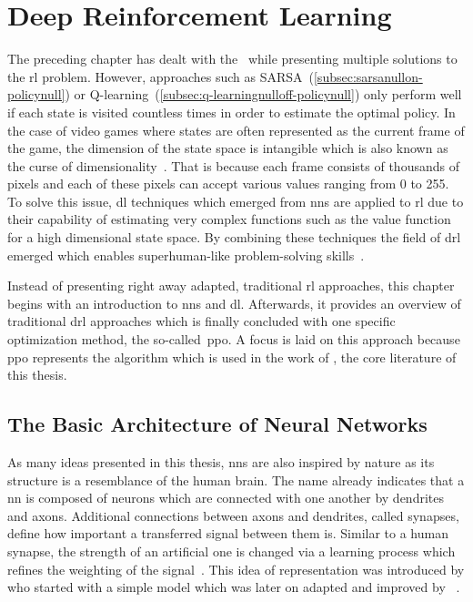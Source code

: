 \documentclass[draft,final]{vutinfth} %
\newcommand{\pautoref}[1]{(\autoref{#1})}
\newcommand{\p}[1]{see p. #1}
\begin{document}
    \glsresetall


    \chapter{Deep Reinforcement Learning}\label{ch:deep-reinforcement-learning}


    The preceding chapter has dealt with the~ while presenting multiple solutions to the \gls{rl} problem.
    However, approaches such as SARSA~\pautoref{subsec:sarsanullon-policynull} or Q-learning~\pautoref{subsec:q-learningnulloff-policynull} only perform well if each state is visited countless times in order to estimate the optimal policy.
    In the case of video games where states are often represented as the current frame of the game, the dimension of the state space is intangible which is also known as the curse of dimensionality~\citep[\p{151}]{goodfellow_deep_2016}.
    That is because each frame consists of thousands of pixels and each of these pixels can accept various values ranging from 0 to 255.
    To solve this issue, \gls{dl} techniques which emerged from \glspl{nn} are applied to \gls{rl} due to their capability of estimating very complex functions such as the value function for a high dimensional state space.
    By combining these techniques the field of \gls{drl} emerged which enables superhuman-like problem-solving skills~\citep{francois-lavet_introduction_2018}.

    Instead of presenting right away adapted, traditional \gls{rl} approaches, this chapter begins with an introduction to \glspl{nn} and \gls{dl}.
    Afterwards, it provides an overview of traditional \gls{drl} approaches which is finally concluded with one specific optimization method, the so-called~\gls{ppo}.
    A focus is laid on this approach because \gls{ppo} represents the algorithm which is used in the work of \citet{burda_large-scale_2018-1}, the core literature of this thesis.


    \section{The Basic Architecture of Neural Networks}\label{sec:the-basic-architecture-of-neural-networks}


    As many ideas presented in this thesis, \glspl{nn} are also inspired by nature as its structure is a resemblance of the human brain.
    The name already indicates that a \gls{nn} is composed of neurons which are connected with one another by dendrites and axons.
    Additional connections between axons and dendrites, called synapses, define how important a transferred signal between them is.
    Similar to a human synapse, the strength of an artificial one is changed via a learning process which refines the weighting of the signal~\citep[\p{1f}]{aggarwal_neural_2018}.
    This idea of representation was introduced by \citeauthor{mcculloch_logical_1943} who started with a simple model which was later on adapted and improved by \citeauthor{rosenblatt_perceptron_1957}~\citep[\p{167}]{awad_deep_2015}.
\end{document}
